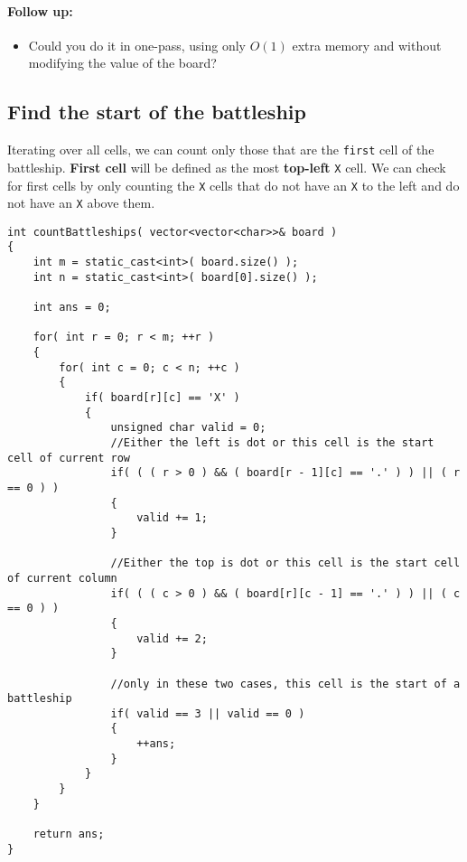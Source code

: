 \paragraph{Follow up:}
\begin{itemize}
\item Could you do it in one-pass, using only $O(1)$ extra memory and without modifying the value of the board?
\end{itemize}

\subsection{Find the start of the battleship}
Iterating over all cells, we can count only those that are the \texttt{first} cell of the battleship. \textbf{First cell} will be defined as the most \textbf{top-left} \texttt{X} cell. We can check for first cells by only counting the \texttt{X} cells that do not have an \texttt{X} to the left and do not have an \texttt{X} above them.

\setcounter{lstlisting}{0}
\begin{lstlisting}[style=customc, caption={Top-left cell}]
int countBattleships( vector<vector<char>>& board )
{
    int m = static_cast<int>( board.size() );
    int n = static_cast<int>( board[0].size() );

    int ans = 0;

    for( int r = 0; r < m; ++r )
    {
        for( int c = 0; c < n; ++c )
        {
            if( board[r][c] == 'X' )
            {
                unsigned char valid = 0;
                //Either the left is dot or this cell is the start cell of current row
                if( ( ( r > 0 ) && ( board[r - 1][c] == '.' ) ) || ( r == 0 ) )
                {
                    valid += 1;
                }

                //Either the top is dot or this cell is the start cell of current column
                if( ( ( c > 0 ) && ( board[r][c - 1] == '.' ) ) || ( c == 0 ) )
                {
                    valid += 2;
                }

                //only in these two cases, this cell is the start of a battleship
                if( valid == 3 || valid == 0 )
                {
                    ++ans;
                }
            }
        }
    }

    return ans;
}
\end{lstlisting}
